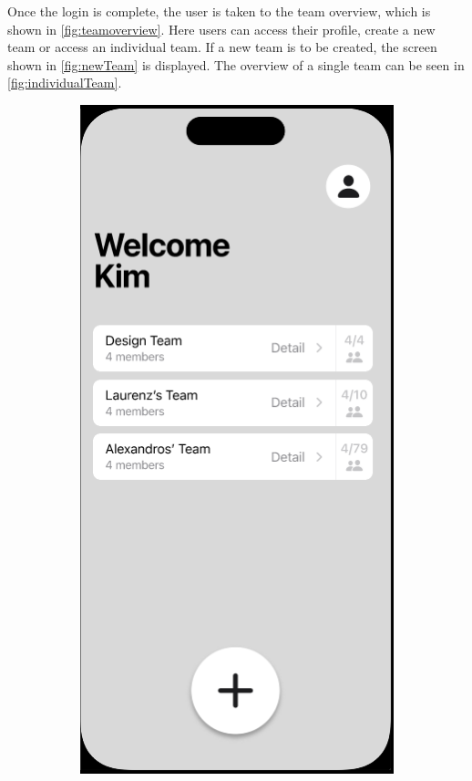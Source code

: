 \documentclass[11pt]{article}
\begin{document}
Once the login is complete, the user is taken to the team overview, which is shown in \autoref{fig:teamoverview}. Here users can access their profile, create a new team or access an individual team.  If a new team is to be created, the screen shown in \autoref{fig:newTeam} is displayed. The overview of a single team can be seen in \autoref{fig:individualTeam}.
\begin{figure}[h!]
     \centering
     \begin{subfigure}[b]{0.3\textwidth}
         \centering
         \includegraphics[width=\textwidth]{figures/team overview.PNG}

\end{subfigure}
\end{figure}
\end{document}
